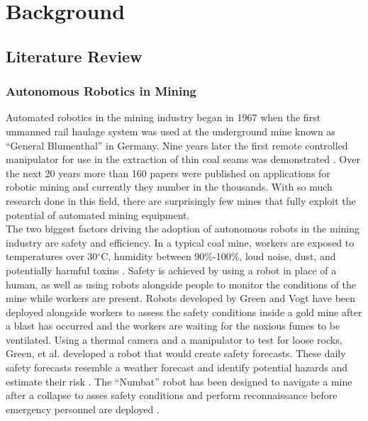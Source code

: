 \chapter{Background}
\label{chap:background}
\section{Literature Review}
\subsection{Autonomous Robotics in Mining}
Automated robotics in the mining industry began in 1967 when the first unmanned rail haulage system was used at the underground mine known as ``General Blumenthal'' in Germany. Nine years later the first remote controlled manipulator for use in the extraction of thin coal seams was demonstrated \cite{mani}. Over the next 20 years more than 160 papers were published on applications for robotic mining and currently they number in the thousands. With so much research done in this field, there are surprisingly few mines that fully exploit the potential of automated mining equipment.\\

The two biggest factors driving the adoption of autonomous robots in the mining industry are safety and efficiency. In a typical coal mine, workers are exposed to temperatures over 30$^\circ$C, humidity between 90\%-100\%, loud noise, dust, and potentially harmful toxins \cite{temp}. Safety is achieved by using a robot in place of a human, as well as using robots alongside people to monitor the conditions of the mine while workers are present. Robots developed by Green \cite{green} and Vogt \cite{vogt} have been deployed alongside workers to assess the safety conditions inside a gold mine after a blast has occurred and the workers are waiting for the noxious fumes to be ventilated. Using a thermal camera and a manipulator to test for loose rocks, Green, et al. developed a robot that would create safety forecasts. These daily safety forecasts resemble a weather forecast and identify potential hazards and estimate their risk \cite{greener}. The ``Numbat'' robot has been designed to navigate a mine after a collapse to asses safety conditions and perform reconnaissance before emergency personnel are deployed \cite{numbat2}.\\

